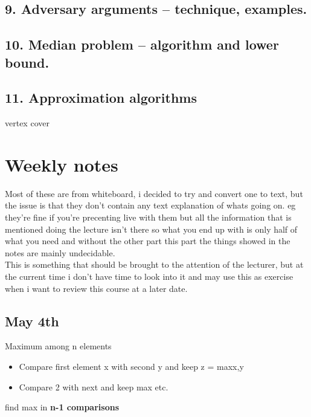 \documentclass[a4paper,10pt,titlepage]{report}
\begin{document}
\newpage
\section{9. Adversary arguments – technique, examples.}





\newpage
\section{10. Median problem – algorithm and lower bound.}





\newpage
\section{11. Approximation algorithms}

vertex cover

\newpage
\chapter{Weekly notes}
Most of these are from whiteboard, i decided to try and convert one to text, but the issue is that they don't contain any text explanation of whats going on. eg they're fine if you're precenting live with them but all the information that is mentioned doing the lecture isn't there so what you end up with is only half of what you need and without the other part this part the things showed in the notes are mainly undecidable.\\

This is something that should be brought to the attention of the lecturer, but at the current time i don't have time to look into it and may use this as exercise when i want to review this course at a later date.\\
\newpage
\section{May 4th}
Maximum among n elements\\
\begin{itemize}
\item Compare first element x with second y and keep z = max{x,y}
\item Compare 2 with next and keep max etc.
\end{itemize}
find max in \textbf{n-1 comparisons}\\
\end{document}
